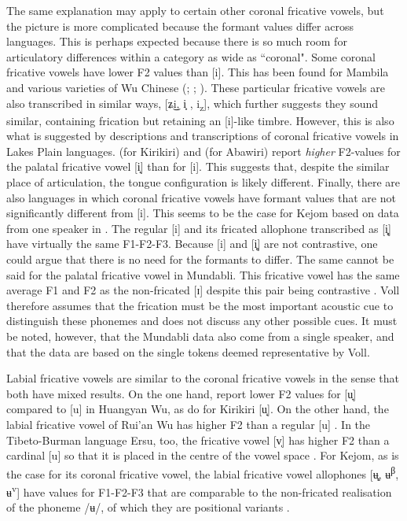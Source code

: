 \documentclass[output=paper,colorlinks,citecolor=brown,chinesefont]{langscibook}
\begin{document}
The same explanation may apply to certain other coronal fricative vowels, but the picture is more complicated because the formant values differ across languages. This is perhaps expected because there is so much room for articulatory differences within a category as wide as ``coronal". Some coronal fricative vowels have lower F2 values than [i]. This has been found for Mambila \citep{connell_2007} and various varieties of Wu Chinese (\cite{Ling_2007}; \cite{VandeWeijer&al_2021}; \cite{Shi&Chen_2022}). These particular fricative vowels are also transcribed in similar ways, [ʑ͜i, i̟ , i\textsubscript{z}], which further suggests they sound similar, containing frication but retaining an [i]-like timbre. However, this is also what is suggested by descriptions and transcriptions of coronal fricative vowels in Lakes Plain languages. \citet{clouse&clouse_1993} (for Kirikiri) and \citet[53]{Yoder_2020} (for Abawiri) report \textit{higher} F2-values for the palatal fricative vowel [i̝] than for [i]. This suggests that, despite the similar place of articulation, the tongue configuration is likely different. Finally, there are also languages in which coronal fricative vowels have formant values that are not significantly different from [i]. This seems to be the case for Kejom based on data from one speaker in \citet{Faytak&Akumbu_2021}. The regular [i] and its fricated allophone transcribed as [i̻] have virtually the same F1-F2-F3. Because [i] and [i̻] are not contrastive, one could argue that there is no need for the formants to differ. The same cannot be said for the palatal fricative vowel in Mundabli. This fricative vowel has the same average F1 and F2 as the non-fricated [ɪ] despite this pair being contrastive \citep[40]{Voll_2017}. Voll therefore assumes that the frication must be the most important acoustic cue to distinguish these phonemes and does not discuss any other possible cues. It must be noted, however, that the Mundabli data also come from a single speaker, and that the data are based on the single tokens deemed representative by Voll.

Labial fricative vowels are similar to the coronal fricative vowels in the sense that both have mixed results. On the one hand, \citet{VandeWeijer&al_2021} report lower F2 values for [u̟] compared to [u] in Huangyan Wu, as do \citet{clouse&clouse_1993} for Kirikiri [u̝]. On the other hand, the labial fricative vowel of Rui'an Wu has higher F2 than a regular [u] \citep{Hu&He_2019}. In the Tibeto-Burman language Ersu, too, the fricative vowel [v̩] has higher F2 than a cardinal [u] so that it is placed in the centre of the vowel space \citep{Chirkova&al_2015}. For Kejom, as is the case for its coronal fricative vowel, the labial fricative vowel allophones [ʉ̻, ʉ\textsuperscript{β}, ʉ\textsuperscript{v}] have values for F1-F2-F3 that are comparable to the non-fricated realisation of the phoneme /ʉ/, of which they are positional variants \citep{Faytak&Akumbu_2021}.
\end{document}
